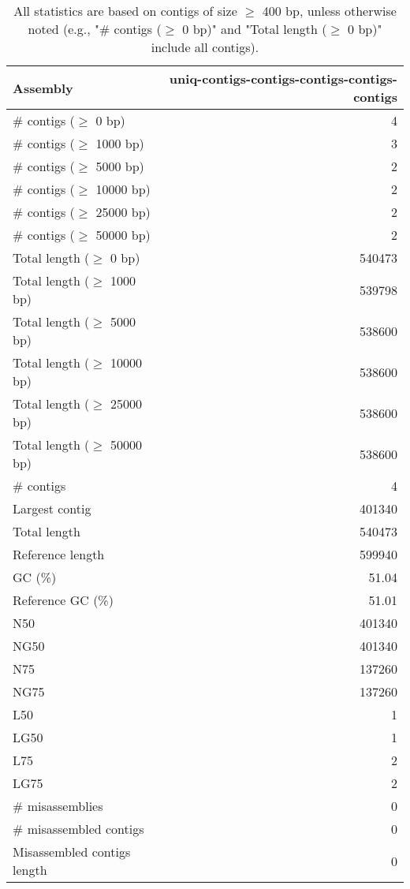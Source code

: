 \documentclass[12pt,a4paper]{article}
\begin{document}
\begin{table}[ht]
\begin{center}
\caption{All statistics are based on contigs of size $\geq$ 400 bp, unless otherwise noted (e.g., "\# contigs ($\geq$ 0 bp)" and "Total length ($\geq$ 0 bp)" include all contigs).}
\begin{tabular}{|l*{1}{|r}|}
\hline
Assembly & uniq-contigs-contigs-contigs-contigs-contigs \\ \hline
\# contigs ($\geq$ 0 bp) & 4 \\ \hline
\# contigs ($\geq$ 1000 bp) & 3 \\ \hline
\# contigs ($\geq$ 5000 bp) & 2 \\ \hline
\# contigs ($\geq$ 10000 bp) & 2 \\ \hline
\# contigs ($\geq$ 25000 bp) & 2 \\ \hline
\# contigs ($\geq$ 50000 bp) & 2 \\ \hline
Total length ($\geq$ 0 bp) & 540473 \\ \hline
Total length ($\geq$ 1000 bp) & 539798 \\ \hline
Total length ($\geq$ 5000 bp) & 538600 \\ \hline
Total length ($\geq$ 10000 bp) & 538600 \\ \hline
Total length ($\geq$ 25000 bp) & 538600 \\ \hline
Total length ($\geq$ 50000 bp) & 538600 \\ \hline
\# contigs & 4 \\ \hline
Largest contig & 401340 \\ \hline
Total length & 540473 \\ \hline
Reference length & 599940 \\ \hline
GC (\%) & 51.04 \\ \hline
Reference GC (\%) & 51.01 \\ \hline
N50 & 401340 \\ \hline
NG50 & 401340 \\ \hline
N75 & 137260 \\ \hline
NG75 & 137260 \\ \hline
L50 & 1 \\ \hline
LG50 & 1 \\ \hline
L75 & 2 \\ \hline
LG75 & 2 \\ \hline
\# misassemblies & 0 \\ \hline
\# misassembled contigs & 0 \\ \hline
Misassembled contigs length & 0 \\ \hline

\end{tabular}
\end{center}
\end{table}
\end{document}
